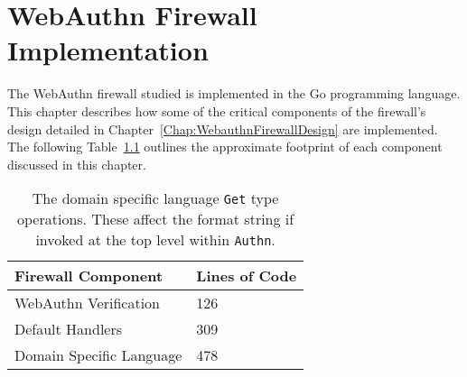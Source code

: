

\chapter{WebAuthn Firewall Implementation}\label{Chap:WebauthnFirewallImplementation}

The WebAuthn firewall studied is implemented in the Go programming language. This chapter describes how some of the critical components of the firewall's design detailed in Chapter~\ref{Chap:WebauthnFirewallDesign} are implemented. The following Table~\ref{Table:ImplementationFootprint} outlines the approximate footprint of each component discussed in this chapter.

\begin{table}[h]
\centering

\begin{tabular}{ m{5cm} m{3cm}  } 
 \hline
 Firewall Component & Lines of Code \\ 
 \hline \hline

 WebAuthn Verification & 126 \\ \hline

 Default Handlers & 309 \\ \hline

 Domain Specific Language & 478 \\ \hline

\end{tabular}
\caption{The domain specific language \lstinline{Get} type operations. These affect the format string if invoked at the top level within \lstinline|Authn|.}
\label{Table:ImplementationFootprint}
\end{table}


